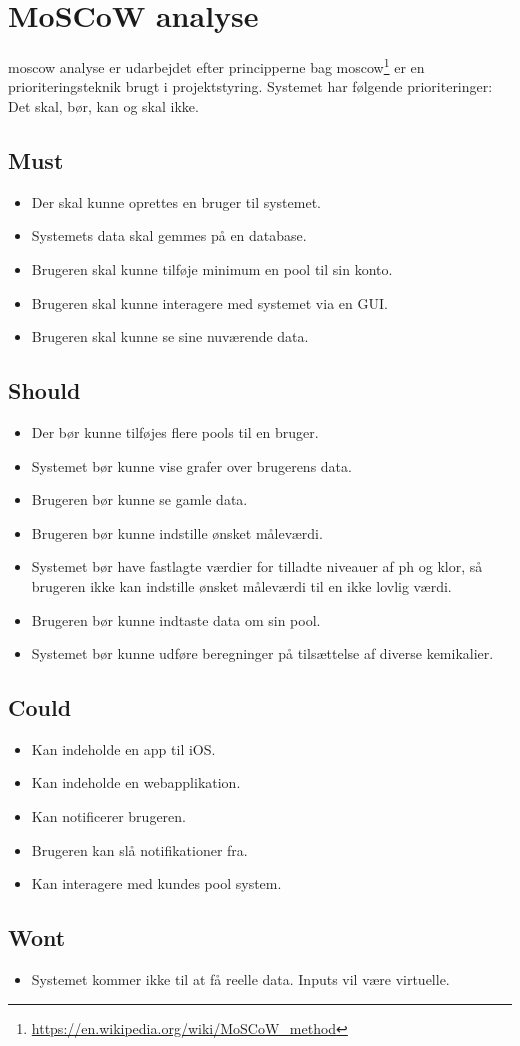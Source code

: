 \section{MoSCoW analyse}
\gls{moscow} analyse er udarbejdet efter principperne bag \gls{moscow}\footnote{\url{https://en.wikipedia.org/wiki/MoSCoW_method}} er en prioriteringsteknik brugt i projektstyring. Systemet har følgende prioriteringer: Det skal, bør, kan og skal ikke.

\subsection*{Must}
\begin{itemize}
	\item Der skal kunne oprettes en bruger til systemet.
	\item Systemets data skal gemmes på en database.  
	\item Brugeren skal kunne tilføje minimum en pool til sin konto. 
	\item Brugeren skal kunne interagere med systemet via en GUI. 
	\item Brugeren skal kunne se sine nuværende data.
\end{itemize}

\subsection*{Should}
\begin{itemize}
	\item Der bør kunne tilføjes flere pools til en bruger. 
	\item Systemet bør kunne vise grafer over brugerens data.
	\item Brugeren bør kunne se gamle data.
	\item Brugeren bør kunne indstille ønsket måleværdi.
	\item Systemet bør have fastlagte værdier for tilladte niveauer af ph og klor, så brugeren ikke kan indstille ønsket måleværdi til en ikke lovlig værdi.
	\item Brugeren bør kunne indtaste data om sin pool.
	\item Systemet bør kunne udføre beregninger på tilsættelse af diverse kemikalier.
\end{itemize}

\subsection*{Could}
\begin{itemize}
	\item Kan indeholde en app til iOS.
	\item Kan indeholde en webapplikation.
	\item Kan notificerer brugeren.
	\item Brugeren kan slå notifikationer fra.
	\item Kan interagere med kundes pool system.
\end{itemize}

\subsection*{Wont}
\begin{itemize}
	\item Systemet kommer ikke til at få reelle data. Inputs vil være virtuelle.
\end{itemize}
